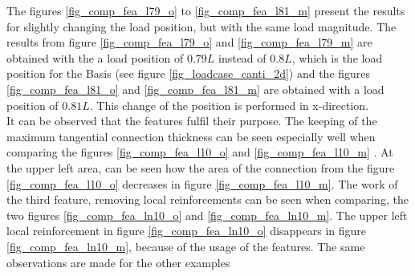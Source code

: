 The figures \ref{fig_comp_fea_l79_o} to \ref{fig_comp_fea_l81_m}
 present the results for slightly changing the 
 load position, but with the same load magnitude. The results from figure
 \ref{fig_comp_fea_l79_o} and \ref{fig_comp_fea_l79_m} are obtained 
 with the a load position of $0.79 L$ instead of $0.8 L$,
 which is the load position for the Basis
  (see figure \ref{fig_loadcase_canti_2d}) and the
 figures \ref{fig_comp_fea_l81_o} and
 \ref{fig_comp_fea_l81_m} are obtained with
 a load position of $0.81 L$. This change of the position
 is performed in x-direction.\\
 
It can be observed that the features fulfil their purpose.
The keeping of the maximum tangential
connection thickness can be seen especially well
when comparing the figures \ref{fig_comp_fea_l10_o}
and \ref{fig_comp_fea_l10_m} .
 At the upper left area, can be seen how
 the area of the connection from the figure
 \ref{fig_comp_fea_l10_o}
decreases in figure
\ref{fig_comp_fea_l10_m}.
The work of the third feature,
removing local reinforcements can be
seen when comparing, the two figures
\ref{fig_comp_fea_ln10_o} and
\ref{fig_comp_fea_ln10_m}.
The upper left local reinforcement in
figure \ref{fig_comp_fea_ln10_o}
disappears in figure \ref{fig_comp_fea_ln10_m}, because of the
usage of the features. The same observations are made for the
other examples\\

\vspace{0.75cm}


